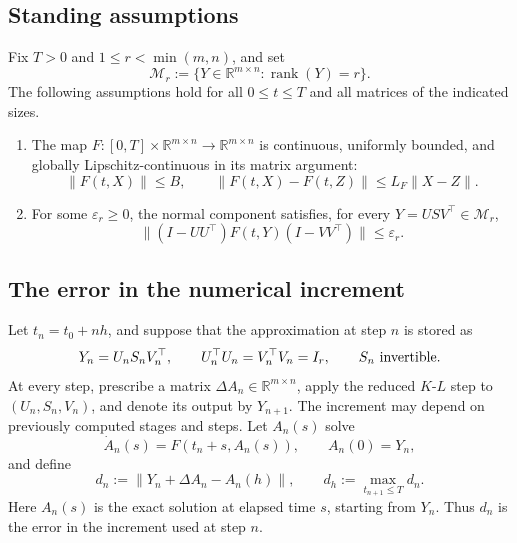 \documentclass[]{article}
\numberwithin{equation}{section}
\theoremstyle{plain}
\theoremstyle{remark}
\numberwithin{algorithm}{section}
\newcommand{\R}{\mathbb{R}}
\newcommand{\Mr}{\mathcal{M}_r}
\newcommand{\eps}{\varepsilon}
\newcommand{\rank}{\operatorname{rank}}
\begin{document}
\subsection{Standing assumptions}
\label{sec:assumptions}

Fix \(T>0\) and \(1\le r<\min(m,n)\), and set
\begin{equation}\label{eq:rank-strata}
 \Mr:=\{Y\in\R^{m\times n}:\rank(Y)=r\}.
\end{equation}
The following assumptions hold for all \(0\le t\le T\) and all matrices
of the indicated sizes.

\begin{enumerate}
\item The map \(F:[0,T]\times\R^{m\times n}\to\R^{m\times n}\) is
continuous, uniformly bounded, and globally Lipschitz-continuous in its
matrix argument:
\begin{equation}\label{eq:assumption-BL}
 \|F(t,X)\|\le B,
 \qquad
 \|F(t,X)-F(t,Z)\|\le L_F\|X-Z\|.
\end{equation}

\item For some \(\eps_r\ge0\), the normal component satisfies, for every
\(Y=USV^\top\in\Mr\),
\begin{equation}\label{eq:assumption-normal}
 \|(I-UU^\top)F(t,Y)(I-VV^\top)\|\le\eps_r.
\end{equation}
\end{enumerate}

\subsection{The error in the numerical increment}
\label{sec:defect}

Let \(t_n=t_0+nh\), and suppose that the approximation at step \(n\) is
stored as
\begin{equation}\label{eq:method-start}
 Y_n=U_nS_nV_n^\top,
 \qquad U_n^\top U_n=V_n^\top V_n=I_r,
 \qquad S_n\ \hbox{invertible}.
\end{equation}
At every step, prescribe a matrix
\(\Delta A_n\in\R^{m\times n}\), apply the reduced \(K\)-\(L\) step to
\((U_n,S_n,V_n)\), and denote its output by
\(Y_{n+1}\).  The increment may depend on previously computed stages and
steps.  Let \(A_n(s)\) solve
\begin{equation}\label{eq:increment-local-solution}
 \dot A_n(s)=F(t_n+s,A_n(s)),\qquad A_n(0)=Y_n,
\end{equation}
and define
\begin{equation}\label{eq:increment-defect}
 d_n:=\|Y_n+\Delta A_n-A_n(h)\|,
 \qquad d_h:=\max_{t_{n+1}\le T}d_n.
\end{equation}
Here \(A_n(s)\) is the exact solution at elapsed time \(s\), starting
from \(Y_n\).  Thus \(d_n\) is the error in the increment used at step \(n\).
\end{document}
